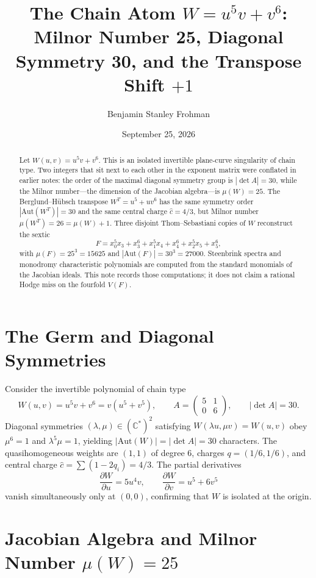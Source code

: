 \documentclass[11pt]{amsart}
\title[The Chain Atom $W=u^5v+v^6$]{The Chain Atom $W=u^5v+v^6$: Milnor Number 25, Diagonal Symmetry 30, and the Transpose Shift $+1$}
\author{Benjamin Stanley Frohman}
\date{September 25, 2026}
\begin{document}
\begin{abstract}
Let $W(u,v)=u^5v+v^6$. This is an isolated invertible plane-curve singularity of chain type. Two integers that sit next to each other in the exponent matrix were conflated in earlier notes: the order of the maximal diagonal symmetry group is $|\det A|=30$, while the Milnor number---the dimension of the Jacobian algebra---is $\mu(W)=25$. The Berglund--H\"ubsch transpose $W^T=u^5+uv^6$ has the same symmetry order $|\mathrm{Aut}(W^T)|=30$ and the same central charge $\hat{c}=4/3$, but Milnor number $\mu(W^T)=26=\mu(W)+1$. Three disjoint Thom--Sebastiani copies of $W$ reconstruct the sextic
\[
  F=x_0^5x_3+x_3^6+x_1^5x_4+x_4^6+x_2^5x_5+x_5^6,
\]
with $\mu(F)=25^3=15625$ and $|\mathrm{Aut}(F)|=30^3=27000$. Steenbrink spectra and monodromy characteristic polynomials are computed from the standard monomials of the Jacobian ideals. This note records those computations; it does not claim a rational Hodge miss on the fourfold $V(F)$.
\end{abstract}

\maketitle

\section{The Germ and Diagonal Symmetries}

Consider the invertible polynomial of chain type
\[
  W(u,v)=u^5v+v^6=v(u^5+v^5),\qquad
  A=\begin{pmatrix}5&1\\0&6\end{pmatrix},\qquad
  |\det A|=30.
\]
Diagonal symmetries $(\lambda,\mu)\in(\mathbb{C}^*)^2$ satisfying $W(\lambda u,\mu v)=W(u,v)$ obey $\mu^6=1$ and $\lambda^5\mu=1$, yielding $|\mathrm{Aut}(W)|=|\det A|=30$ characters. The quasihomogeneous weights are $(1,1)$ of degree $6$, charges $q=(1/6,1/6)$, and central charge $\hat{c}=\sum(1-2q_i)=4/3$. The partial derivatives
\[
  \frac{\partial W}{\partial u}=5u^4v,\qquad \frac{\partial W}{\partial v}=u^5+6v^5
\]
vanish simultaneously only at $(0,0)$, confirming that $W$ is isolated at the origin.

\section{Jacobian Algebra and Milnor Number $\mu(W)=25$}
\end{document}
